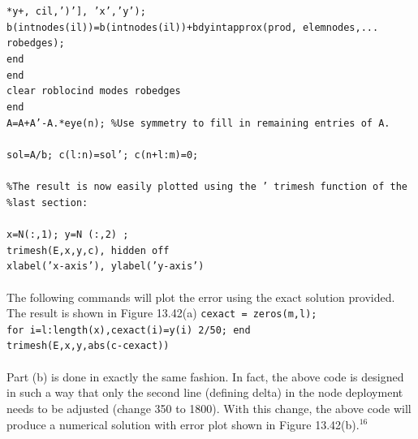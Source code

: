 \documentclass[../main.tex]{subfiles}
\begin{document}
\texttt{*y+, cil,')'], 'x','y'); }\\
\texttt{b(intnodes(il))=b(intnodes(il))+bdyintapprox(prod, elemnodes,...}\\
\texttt{robedges);}\\
\texttt{end}\\
\texttt{end}\\
\texttt{clear roblocind modes robedges}\\
\texttt{end}\\
\texttt{A=A+A'-A.*eye(n); \%Use symmetry to fill in remaining entries of A. }
\\
\\
\texttt{sol=A/b; c(l:n)=sol'; c(n+l:m)=0;}
\\
\\
\texttt{\%The result is now easily plotted using the ' trimesh function of the}
\texttt{\%last section:}\\
\\
\texttt{x=N(:,1); y=N (:,2) ; 
}\\
\texttt{trimesh(E,x,y,c), hidden off}\\
\texttt{xlabel('x-axis'), ylabel('y-axis') 
}\\
\\
The following commands will plot the error using the exact solution provided. 
The result is shown in Figure 13.42(a)
\texttt{cexact = zeros(m,l); }\\
\texttt{for i=l:length(x),cexact(i)=y(i) 2/50; end }\\
\texttt{trimesh(E,x,y,abs(c-cexact)) 
}\\
\\
Part (b) is done in exactly the same fashion. In fact, the above code is designed in 
such a way that only the second line (defining delta) in the node deployment needs 
to be adjusted (change 350 to 1800). With this change, the above code will 
produce a numerical solution with error plot shown in Figure 13.42(b).$^{16}$
\\
\end{document}
